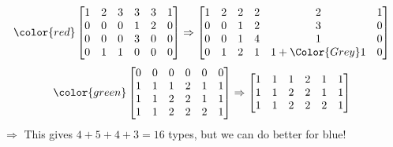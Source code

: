 \begin{frame}
	\begin{equation}
	\color{red}
    \begin{bmatrix}
         1&2&3&3&3&1\\
         0&0&0&1&2&0\\
         0&0&0&3&0&0\\
         0&1&1&0&0&0\\
    \end{bmatrix}\Rightarrow \begin{bmatrix}
	    1&2&2&2&2&1\\
         0&0&1&2&3&0\\
         0&0&1&4&1&0\\
	    0&1&2&1&1+\Color{Grey}1&0\\
    \end{bmatrix}
\end{equation}
\begin{equation}
\color{green}
    \begin{bmatrix}
         0&0&0&0&0&0\\
         1&1&1&2&1&1\\
         1&1&2&2&1&1\\
         1&1&2&2&2&1\\
    \end{bmatrix}\Rightarrow
    \begin{bmatrix}
         1&1&1&2&1&1\\
         1&1&2&2&1&1\\
         1&1&2&2&2&1\\
    \end{bmatrix}
\end{equation}
$\Rightarrow$ This gives $4+5+4+3=16$ types, but we can do better for blue!


\end{frame}
